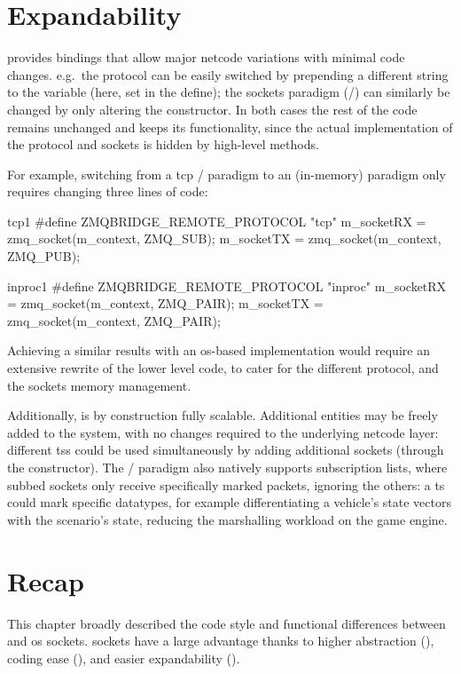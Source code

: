 \section{Expandability}\label{sc:code:expandability}

 provides bindings that allow major \gls{netcode} variations with minimal code changes. e.g.\ the protocol can be easily switched by prepending a different string to the  variable (here, set in the  define); the sockets paradigm (/) can similarly be changed by only altering the constructor. In both cases the rest of the code remains unchanged and keeps its functionality, since the actual implementation of the protocol and sockets is hidden by high-level methods.

For example, switching from a \gls{tcp} / paradigm to an  (in-memory)  paradigm only requires changing three lines of code:

\begin{codelist}{\gls{tcp}}{1}
#define ZMQBRIDGE_REMOTE_PROTOCOL "tcp"
m_socketRX = zmq_socket(m_context, ZMQ_SUB);
m_socketTX = zmq_socket(m_context, ZMQ_PUB);
\end{codelist}

\begin{codelist}{inproc}{1}
#define ZMQBRIDGE_REMOTE_PROTOCOL "inproc"
m_socketRX = zmq_socket(m_context, ZMQ_PAIR);
m_socketTX = zmq_socket(m_context, ZMQ_PAIR);
\end{codelist}

\FLOATnoindent Achieving a similar results with an \gls{os}-based implementation would require an extensive rewrite of the lower level code, to cater for the different protocol, and the sockets memory management.

Additionally,  is by construction fully scalable. Additional entities may be freely added to the system, with no changes required to the underlying \gls{netcode} layer: different \glspl{ts} could be used simultaneously by adding additional sockets (through the  constructor). The  / paradigm also natively supports subscription lists, where subbed sockets only receive specifically marked packets, ignoring the others: a \gls{ts} could mark specific datatypes, for example differentiating a vehicle's state vectors with the scenario's state, reducing the marshalling workload on the game engine.

\section{Recap}\label{sc:code:recap}

This chapter broadly described the code style and functional differences between  and \gls{os} sockets.  sockets have a large advantage thanks to higher abstraction (), coding ease (), and easier expandability ().
